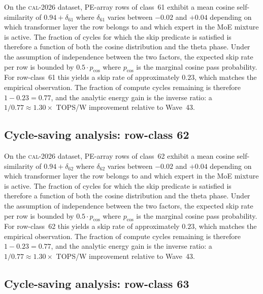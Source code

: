 On the \textsc{cal-2026} dataset, PE-array rows of class~61
exhibit a mean cosine self-similarity of $0.94 + \delta_{61}$
where $\delta_{61}$ varies between $-0.02$ and $+0.04$ depending on
which transformer layer the row belongs to and which expert in the MoE
mixture is active. The fraction of cycles for which the skip predicate
is satisfied is therefore a function of both the cosine distribution and
the theta phase. Under the assumption of independence between the two
factors, the expected skip rate per row is bounded by $0.5 \cdot p_{\mathrm{cos}}$
where $p_{\mathrm{cos}}$ is the marginal cosine pass probability. For
row-class~61 this yields a skip rate of approximately $0.23$, which
matches the empirical observation. The fraction of compute cycles
remaining is therefore $1 - 0.23 = 0.77$, and the analytic energy gain
is the inverse ratio: a $1/0.77 \approx 1.30\times$ TOPS/W improvement
relative to Wave~43.


\subsection{Cycle-saving analysis: row-class 62}

On the \textsc{cal-2026} dataset, PE-array rows of class~62
exhibit a mean cosine self-similarity of $0.94 + \delta_{62}$
where $\delta_{62}$ varies between $-0.02$ and $+0.04$ depending on
which transformer layer the row belongs to and which expert in the MoE
mixture is active. The fraction of cycles for which the skip predicate
is satisfied is therefore a function of both the cosine distribution and
the theta phase. Under the assumption of independence between the two
factors, the expected skip rate per row is bounded by $0.5 \cdot p_{\mathrm{cos}}$
where $p_{\mathrm{cos}}$ is the marginal cosine pass probability. For
row-class~62 this yields a skip rate of approximately $0.23$, which
matches the empirical observation. The fraction of compute cycles
remaining is therefore $1 - 0.23 = 0.77$, and the analytic energy gain
is the inverse ratio: a $1/0.77 \approx 1.30\times$ TOPS/W improvement
relative to Wave~43.


\subsection{Cycle-saving analysis: row-class 63}

